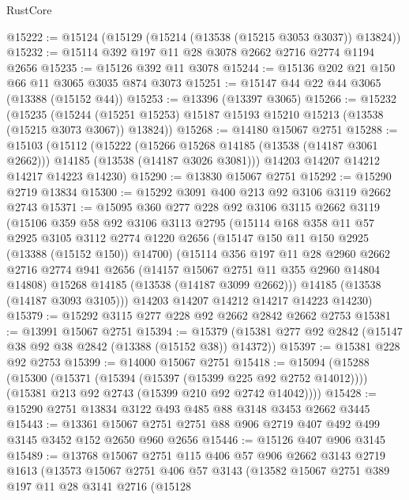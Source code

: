 \begin{lexlean}{RustCore}
\begin{coremodule}
@15222 := @15124 (@15129 (@15214 (@13538 (@15215 @3053 @3037)) @13824))
@15232 := @15114 @392 @197 @11 @28 @3078 @2662 @2716 @2774 @1194 @2656
@15235 := @15126 @392 @11 @3078
@15244 := @15136 @202 @21 @150 @66 @11 @3065 @3035 @874 @3073
@15251 := @15147 @44 @22 @44 @3065 (@13388 (@15152 @44))
@15253 := @13396 (@13397 @3065)
@15266 := @15232
    (@15235
      (@15244 (@15251 @15253) @15187 @15193 @15210 @15213 (@13538 (@15215 @3073 @3067)) @13824))
@15268 := @14180 @15067 @2751
@15288 := @15103
    (@15112
      (@15222
        (@15266 @15268 @14185 (@13538 (@14187 @3061 @2662)))
        @14185
        (@13538 (@14187 @3026 @3081)))
      @14203
      @14207
      @14212
      @14217
      @14223
      @14230)
@15290 := @13830 @15067 @2751
@15292 := @15290 @2719 @13834
@15300 := @15292 @3091 @400 @213 @92 @3106 @3119 @2662 @2743
@15371 := @15095
    @360
    @277
    @228
    @92
    @3106
    @3115
    @2662
    @3119
    (@15106
      @359
      @58
      @92
      @3106
      @3113
      @2795
      (@15114
        @168
        @358
        @11
        @57
        @2925
        @3105
        @3112
        @2774
        @1220
        @2656
        (@15147 @150 @11 @150 @2925 (@13388 (@15152 @150)) @14700)
        (@15114
          @356
          @197
          @11
          @28
          @2960
          @2662
          @2716
          @2774
          @941
          @2656
          (@14157 @15067 @2751 @11 @355 @2960 @14804 @14808)
          @15268
          @14185
          (@13538 (@14187 @3099 @2662)))
        @14185
        (@13538 (@14187 @3093 @3105)))
      @14203
      @14207
      @14212
      @14217
      @14223
      @14230)
@15379 := @15292 @3115 @277 @228 @92 @2662 @2842 @2662 @2753
@15381 := @13991 @15067 @2751
@15394 := @15379 (@15381 @277 @92 @2842 (@15147 @38 @92 @38 @2842 (@13388 (@15152 @38)) @14372))
@15397 := @15381 @228 @92 @2753
@15399 := @14000 @15067 @2751
@15418 := @15094
    (@15288
      (@15300
        (@15371 (@15394 (@15397 (@15399 @225 @92 @2752 @14012))))
        (@15381 @213 @92 @2743 (@15399 @210 @92 @2742 @14042))))
@15428 := @15290 @2751 @13834 @3122 @493 @485 @88 @3148 @3453 @2662 @3445
@15443 := @13361 @15067 @2751 @2751 @88 @906 @2719 @407 @492 @499 @3145 @3452 @152 @2650 @960 @2656
@15446 := @15126 @407 @906 @3145
@15489 := @13768
    @15067
    @2751
    @115
    @406
    @57
    @906
    @2662
    @3143
    @2719
    @1613
    (@13573
      @15067
      @2751
      @406
      @57
      @3143
      (@13582
        @15067
        @2751
        @389
        @197
        @11
        @28
        @3141
        @2716
        (@15128

\end{coremodule}
\end{lexlean}
